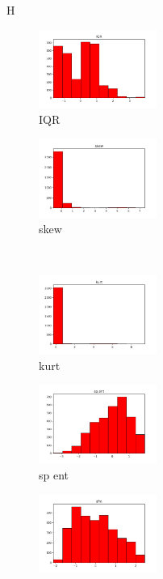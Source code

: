 \documentclass[a4paper]{article}    %
\begin{document}
\begin{figure}{H}
\begin{subfigure}{0.32\textwidth}
        \includegraphics[width=3.85cm]{std_4_IQR}
        \caption{IQR}
        \label{fig:sub_std_5}
    \end{subfigure}\hfill
    \begin{subfigure}{0.32\textwidth}
        \centering
        \includegraphics[width=3.85cm]{std_5_skew}
        \caption{skew}
        \label{fig:sub_std_6}
    \end{subfigure}
    \\
    \begin{subfigure}{0.32\textwidth}
        \centering
        \includegraphics[width=3.85cm]{std_6_kurt}
        \caption{kurt}
        \label{fig:sub_std_7}
    \end{subfigure}\hfill
    \begin{subfigure}{0.32\textwidth}
        \centering
        \includegraphics[width=3.85cm]{std_7_sp_ent}
        \caption{sp ent}
        \label{fig:sub_std_8}
    \end{subfigure}\hfill
    \begin{subfigure}{0.32\textwidth}
        \centering
        \includegraphics[width=3.85cm]{std_8_sfm}

\end{subfigure}
\end{figure}
\end{document}
